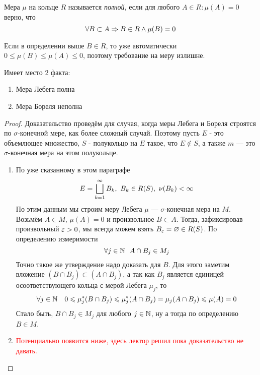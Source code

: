 \begin{definition}
	Мера $\mu$ на кольце $R$ называется \textit{полной}, если для любого $A \in R \colon \mu(A) = 0$ верно, что
	\[
		\forall B \subset A \Rightarrow B \in R \wedge \mu(B) = 0
	\]
\end{definition}

\begin{note}
	Если в определении выше $B \in R$, то уже автоматически $0 \le \mu(B) \le \mu(A) \le 0$, поэтому требование на меру излишне.
\end{note}

\begin{proposition}
	Имеет место 2 факта:
	\begin{enumerate}
		\item Мера Лебега полна
		
		\item Мера Бореля неполна
	\end{enumerate}
\end{proposition}

\begin{proof}
	Доказательство проведём для случая, когда меры Лебега и Бореля строятся по $\sigma$-конечной мере, как более сложный случай. Поэтому пусть $E$ - это объемлющее множество, $S$ - полукольцо на $E$ такое, что $E \notin S$, а также $m$ --- это $\sigma$-конечная мера на этом полукольце.
	\begin{enumerate}
		\item По уже сказанному в этом параграфе
		\[
			E = \bigsqcup_{k = 1}^\infty B_k,\ B_k \in R(S),\ \nu(B_k) < \infty
		\]
		По этим данным мы строим меру Лебега $\mu$ --- $\sigma$-конечная мера на $M$. Возьмём $A \in M$, $\mu(A) = 0$ и произвольное $B \subset A$. Тогда, зафиксировав произвольный $\varepsilon > 0$, мы всегда можем взять $B_{\varepsilon} = \varnothing \in R(S)$. По определению измеримости
		\[
			\forall j \in \mathbb{N}\ \ A \cap B_j \in M_j
		\]
		Точно такое же утверждение надо доказать для $B$. Для этого заметим вложение $(B \cap B_j) \subset (A \cap B_j)$, а так как $B_j$ является единицей осоответствующего кольца с мерой Лебега $\mu_j$, то
		\[
			\forall j \in \mathbb{N} \quad 0 \leqslant \mu_j^*(B \cap B_j) \leqslant \mu_j^*(A \cap B_j) = \mu_j(A \cap B_j) \leqslant \mu(A) = 0
		\]
		Стало быть, $B \cap B_j \in M_j$ для любого $j \in \mathbb{N}$, ну а тогда по определению $B \in M$.
		
		\item \textcolor{red}{Потенциально появится ниже, здесь лектор решил пока доказательство не давать.}
	\end{enumerate}
\end{proof}

